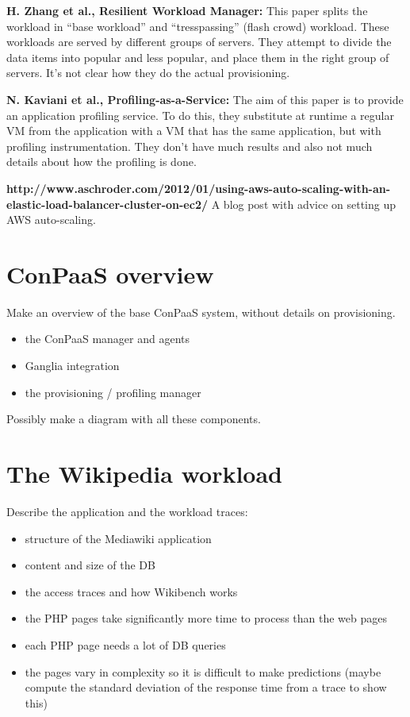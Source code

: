\documentclass[10pt,twocolumn]{article}
\begin{document}
{\bf H. Zhang et al., Resilient Workload Manager:} 
This paper splits the workload in ``base workload'' and ``tresspassing'' (flash crowd)
workload. These workloads are served by different groups of servers. They attempt to 
divide the data items into popular and less popular, and place them in the right
group of servers. It's not clear how they do the actual provisioning.

{\bf N. Kaviani et al., Profiling-as-a-Service:}
The aim of this paper is to provide an application profiling service. To do
this, they substitute at runtime a regular VM from the application with
a VM that has the same application, but with profiling instrumentation.
They don't have much results and also not much details about how the
profiling is done.

{\bf http://www.aschroder.com/2012/01/using-aws-auto-scaling-with-an-elastic-load-balancer-cluster-on-ec2/ }
A blog post with advice on setting up AWS auto-scaling.

\section*{ConPaaS overview}

Make an overview of the base ConPaaS system, without details on  
provisioning.

\begin{itemize}
\item the ConPaaS manager and agents
\item Ganglia integration
\item the provisioning / profiling manager
\end{itemize}

Possibly make a diagram with all these components.


\section*{The Wikipedia workload}

Describe the application and the workload traces: 


\begin{itemize}
\item structure of the Mediawiki application
\item content and size of the DB
\item the access traces and how Wikibench works
\end{itemize}

\begin{itemize}
\item the PHP pages take significantly more time to process
than the web pages
\item each PHP page needs a lot of DB queries 
\item the pages vary in complexity so it is difficult to make
predictions (maybe compute the standard deviation of the response time
from a trace to show this)
\end{itemize}
\end{document}
